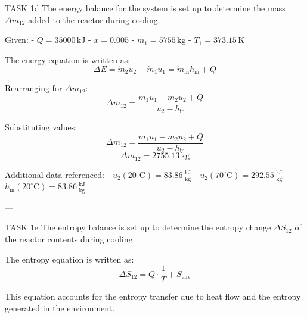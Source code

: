 TASK 1d  
The energy balance for the system is set up to determine the mass \( \Delta m_{12} \) added to the reactor during cooling.  

Given:  
- \( Q = 35000 \, \text{kJ} \)  
- \( x = 0.005 \)  
- \( m_1 = 5755 \, \text{kg} \)  
- \( T_1 = 373.15 \, \text{K} \)  

The energy equation is written as:  
\[
\Delta E = \dot{m}_2 u_2 - \dot{m}_1 u_1 = \dot{m}_{\text{in}} h_{\text{in}} + Q
\]  

Rearranging for \( \Delta m_{12} \):  
\[
\Delta m_{12} = \frac{m_1 u_1 - m_2 u_2 + Q}{u_2 - h_{\text{in}}}
\]  

Substituting values:  
\[
\Delta m_{12} = \frac{m_1 u_1 - m_2 u_2 + Q}{u_2 - h_{\text{in}}}
\]  
\[
\Delta m_{12} = 2755.13 \, \text{kg}
\]  

Additional data referenced:  
- \( u_2(20^\circ\text{C}) = 83.86 \, \frac{\text{kJ}}{\text{kg}} \)  
- \( u_2(70^\circ\text{C}) = 292.55 \, \frac{\text{kJ}}{\text{kg}} \)  
- \( h_{\text{in}}(20^\circ\text{C}) = 83.86 \, \frac{\text{kJ}}{\text{kg}} \)  

---

TASK 1e  
The entropy balance is set up to determine the entropy change \( \Delta S_{12} \) of the reactor contents during cooling.  

The entropy equation is written as:  
\[
\Delta S_{12} = Q \cdot \frac{1}{T} + S_{\text{env}}
\]  

This equation accounts for the entropy transfer due to heat flow and the entropy generated in the environment.